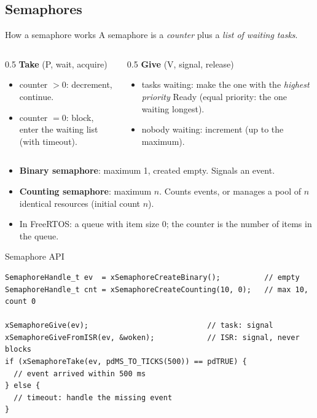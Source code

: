 \subsection{Semaphores}
\begin{frame}{How a semaphore works}
  A semaphore is a \emph{counter} plus a \emph{list of waiting tasks}.
  \begin{columns}[T]
    \begin{column}{0.5\textwidth}
      \textbf{Take} (P, wait, acquire)
      \begin{itemize}
        \item counter $> 0$: decrement, continue.
        \item counter $= 0$: block, enter the waiting list (with timeout).
      \end{itemize}
    \end{column}
    \begin{column}{0.5\textwidth}
      \textbf{Give} (V, signal, release)
      \begin{itemize}
        \item tasks waiting: make the one with the \emph{highest priority} Ready (equal priority: the one waiting longest).
        \item nobody waiting: increment (up to the maximum).
      \end{itemize}
    \end{column}
  \end{columns}
  \begin{itemize}
    \item \textbf{Binary semaphore}: maximum 1, created empty. Signals an event.
    \item \textbf{Counting semaphore}: maximum $n$. Counts events, or manages a pool of $n$ identical resources (initial count $n$).
    \item In FreeRTOS: a queue with item size 0; the counter is the number of items in the queue.
  \end{itemize}
\end{frame}

\begin{frame}[fragile]{Semaphore API}
\begin{lstlisting}
SemaphoreHandle_t ev  = xSemaphoreCreateBinary();          // empty
SemaphoreHandle_t cnt = xSemaphoreCreateCounting(10, 0);   // max 10, count 0

xSemaphoreGive(ev);                           // task: signal
xSemaphoreGiveFromISR(ev, &woken);            // ISR: signal, never blocks
if (xSemaphoreTake(ev, pdMS_TO_TICKS(500)) == pdTRUE) {
  // event arrived within 500 ms
} else {
  // timeout: handle the missing event
}
\end{lstlisting}
\end{frame}

